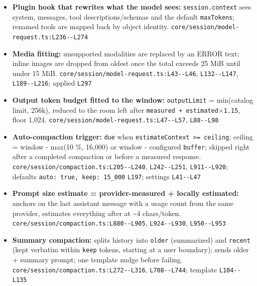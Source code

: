 \begin{itemize}
\item \textbf{Plugin hook that rewrites what the model sees:} \texttt{session.\allowbreak{}context} sees system, messages, tool descriptions/schemas and the default \texttt{maxTokens}; renamed tools are mapped back by object identity. \texttt{core/\allowbreak{}session/\allowbreak{}model-\allowbreak{}request.\allowbreak{}ts:\allowbreak{}L236-\allowbreak{}-\allowbreak{}L274}
\item \textbf{Media fitting:} unsupported modalities are replaced by an ERROR text; inline images are dropped from oldest once the total exceeds 25 MiB until under 15 MiB. \texttt{core/\allowbreak{}session/\allowbreak{}model-\allowbreak{}request.\allowbreak{}ts:\allowbreak{}L43-\allowbreak{}-\allowbreak{}L46}, \texttt{L132-\allowbreak{}-\allowbreak{}L147}, \texttt{L189-\allowbreak{}-\allowbreak{}L216}; applied \texttt{L297}
\item \textbf{Output token budget fitted to the window:} \texttt{outputLimit} = min(catalog limit, 256k), reduced to the room left after \texttt{measured + estimated$\times$1.\allowbreak{}15}, floor 1,024. \texttt{core/\allowbreak{}session/\allowbreak{}model-\allowbreak{}request.\allowbreak{}ts:\allowbreak{}L47-\allowbreak{}-\allowbreak{}L57}, \texttt{L88-\allowbreak{}-\allowbreak{}L98}
\item \textbf{Auto-compaction trigger:} \texttt{due} when \texttt{estimateContext >= ceiling}; ceiling = window - max(10 \%, 16,000) or window - configured \texttt{buffer}; skipped right after a completed compaction or before a measured response. \texttt{core/\allowbreak{}session/\allowbreak{}compaction.\allowbreak{}ts:\allowbreak{}L205-\allowbreak{}-\allowbreak{}L240}, \texttt{L242-\allowbreak{}-\allowbreak{}L251}, \texttt{L911-\allowbreak{}-\allowbreak{}L920}; defaults \texttt{auto:\allowbreak{} true, keep:\allowbreak{} 15\_\allowbreak{}000} \texttt{L197}; settings \texttt{L41-\allowbreak{}-\allowbreak{}L47}
\item \textbf{Prompt size estimate = provider-measured + locally estimated:} anchors on the last assistant message with a usage count from the same provider, estimates everything after at \textasciitilde{}4 chars/token. \texttt{core/\allowbreak{}session/\allowbreak{}compaction.\allowbreak{}ts:\allowbreak{}L880-\allowbreak{}-\allowbreak{}L905}, \texttt{L924-\allowbreak{}-\allowbreak{}L930}, \texttt{L950-\allowbreak{}-\allowbreak{}L953}
\item \textbf{Summary compaction:} splits history into \texttt{older} (summarized) and \texttt{recent} (kept verbatim within \texttt{keep} tokens, starting at a user boundary); sends older + summary prompt; one template nudge before failing. \texttt{core/\allowbreak{}session/\allowbreak{}compaction.\allowbreak{}ts:\allowbreak{}L272-\allowbreak{}-\allowbreak{}L316}, \texttt{L708-\allowbreak{}-\allowbreak{}L744}; template \texttt{L104-\allowbreak{}-\allowbreak{}L135}

\end{itemize}
